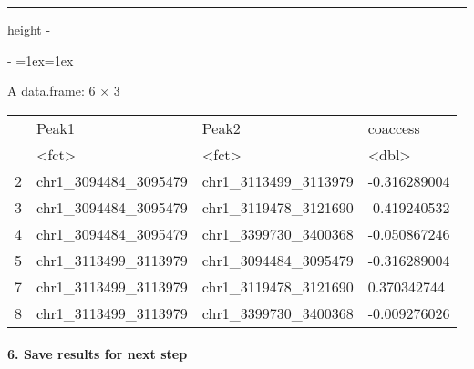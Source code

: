 \documentclass[letterpaper,10pt,english]{sphinxmanual}
\makeatletter
\newenvironment{nbsphinxfancyoutput}{%
    \let\sphinxincludegraphics\nbsphinxincludegraphics
    \nbsphinx@image@maxheight\textheight
    \advance\nbsphinx@image@maxheight -2\fboxsep   %
    \advance\nbsphinx@image@maxheight -2\fboxrule  %
    \advance\nbsphinx@image@maxheight -\baselineskip
\def\nbsphinxfcolorbox{\spx@fcolorbox{nbsphinx-code-border}{white}}%
\def\FrameCommand{\nbsphinxfcolorbox\nbsphinxfancyaddprompt\@empty}%
\def\FirstFrameCommand{\nbsphinxfcolorbox\nbsphinxfancyaddprompt\sphinxVerbatim@Continues}%
\def\MidFrameCommand{\nbsphinxfcolorbox\sphinxVerbatim@Continued\sphinxVerbatim@Continues}%
\def\LastFrameCommand{\nbsphinxfcolorbox\sphinxVerbatim@Continued\@empty}%
\MakeFramed{\advance\hsize-\width\@totalleftmargin\z@\linewidth\hsize\@setminipage}%
\lineskip=1ex\lineskiplimit=1ex\raggedright%
}{\par\unskip\@minipagefalse\endMakeFramed}
\def\nbsphinxfancyaddprompt{\ifvoid\nbsphinxpromptbox\else
    \kern\fboxrule\kern\fboxsep
    \copy\nbsphinxpromptbox
    \kern-\ht\nbsphinxpromptbox\kern-\dp\nbsphinxpromptbox
    \kern-\fboxsep\kern-\fboxrule\nointerlineskip
    \fi}
\newlength\nbsphinxcodecellspacing
\newcommand*{\nbsphinxincludegraphics}[2][]{%
    \gdef\spx@includegraphics@options{#1}%
    \setbox\spx@image@box\hbox{\texttt{[image: \#2]}}%
    \in@false
    \ifdim \wd\spx@image@box>\linewidth
      \g@addto@macro\spx@includegraphics@options{,width=\linewidth}%
      \in@true
    \fi
    \ifdim \ht\spx@image@box>\nbsphinx@image@maxheight
      \g@addto@macro\spx@includegraphics@options{,height=\nbsphinx@image@maxheight}%
      \in@true
    \fi
    \ifin@
      \g@addto@macro\spx@includegraphics@options{,keepaspectratio}%
    \fi
    \setbox\spx@image@box\box\voidb@x %
    \expandafter\includegraphics\expandafter[\spx@includegraphics@options]{#2}%
}%
\makeatother
\begin{document}
\hrule height -\fboxrule\relax
\vspace{\nbsphinxcodecellspacing}

\makeatletter\setbox\nbsphinxpromptbox\box\voidb@x\makeatother

\begin{nbsphinxfancyoutput}
A data.frame: 6 × 3
\begin{tabular}{r|lll}
  & Peak1 & Peak2 & coaccess\\
  & <fct> & <fct> & <dbl>\\
\hline
    2 & chr1\_3094484\_3095479 & chr1\_3113499\_3113979 & -0.316289004\\
    3 & chr1\_3094484\_3095479 & chr1\_3119478\_3121690 & -0.419240532\\
    4 & chr1\_3094484\_3095479 & chr1\_3399730\_3400368 & -0.050867246\\
    5 & chr1\_3113499\_3113979 & chr1\_3094484\_3095479 & -0.316289004\\
    7 & chr1\_3113499\_3113979 & chr1\_3119478\_3121690 &  0.370342744\\
    8 & chr1\_3113499\_3113979 & chr1\_3399730\_3400368 & -0.009276026\\
\end{tabular}
\end{nbsphinxfancyoutput}


\paragraph{6. Save results for next step}
\label{\detokenize{notebooks/01_ATAC-seq_data_processing/option1_scATAC-seq_data_analysis_with_cicero/01_atacdata_to_cicero:6.-Save-results-for-next-step}}
{
\begin{sphinxVerbatim}[commandchars=\\\{\}]
\llap{\color{nbsphinxin}[ ]:\,\hspace{\fboxrule}\hspace{\fboxsep}}  
      
      
\end{sphinxVerbatim}
}
\end{document}
